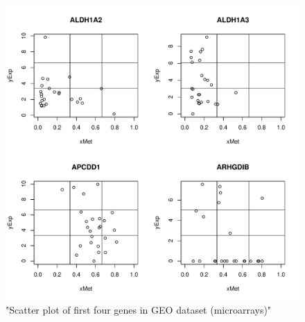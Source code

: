\documentclass[a4paper,10pt]{article}\usepackage[]{graphicx}\usepackage[]{color}
\makeatletter
\def\maxwidth{ %
  \ifdim\Gin@nat@width>\linewidth
    \linewidth
  \else
    \Gin@nat@width
  \fi
}
\newenvironment{knitrout}{}{} %
\makeatother
\begin{document}
\begin{figure}
\begin{knitrout}
\color{fgcolor}
\includegraphics[width=\maxwidth]{figure/plot4Genes3-1} 

\end{knitrout}
\caption{"Scatter plot of first four genes in GEO dataset (microarrays)"\label{plot4Genes3}}
\end{figure}
\end{document}
